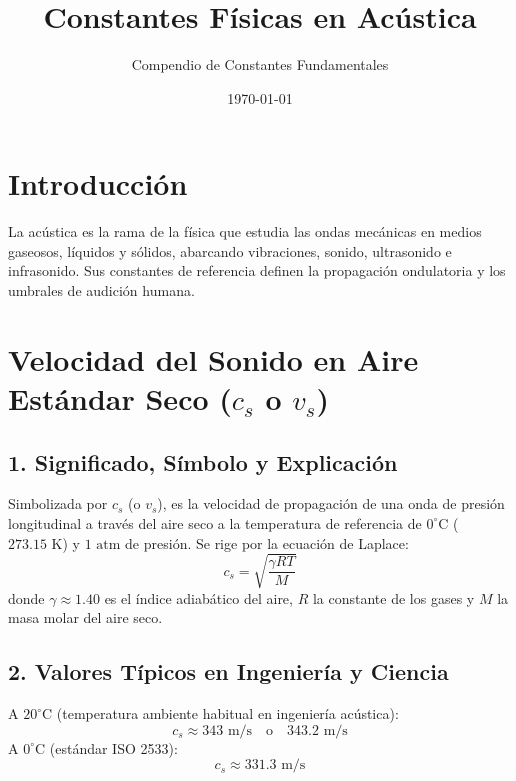 \documentclass[12pt,a4paper]{article}
\title{\textbf{Constantes Físicas en Acústica}}
\author{Compendio de Constantes Fundamentales}
\date{\today}
\begin{document}
\maketitle

\section*{Introducción}
La acústica es la rama de la física que estudia las ondas mecánicas en medios gaseosos, líquidos y sólidos, abarcando vibraciones, sonido, ultrasonido e infrasonido. Sus constantes de referencia definen la propagación ondulatoria y los umbrales de audición humana.

\section{Velocidad del Sonido en Aire Estándar Seco ($c_s$ o $v_s$)}

\subsection*{1. Significado, Símbolo y Explicación}
Simbolizada por $c_s$ (o $v_s$), es la velocidad de propagación de una onda de presión longitudinal a través del aire seco a la temperatura de referencia de $0^\circ\text{C}$ ($273.15\text{ K}$) y $1\text{ atm}$ de presión. Se rige por la ecuación de Laplace:
\begin{equation*}
c_s = \sqrt{\frac{\gamma R T}{M}}
\end{equation*}
donde $\gamma \approx 1.40$ es el índice adiabático del aire, $R$ la constante de los gases y $M$ la masa molar del aire seco.

\subsection*{2. Valores Típicos en Ingeniería y Ciencia}
A $20^\circ\text{C}$ (temperatura ambiente habitual en ingeniería acústica):
\begin{equation*}
c_s \approx 343 \text{ m/s} \quad \text{o} \quad 343.2 \text{ m/s}
\end{equation*}
A $0^\circ\text{C}$ (estándar ISO 2533):
\begin{equation*}
c_s \approx 331.3 \text{ m/s}
\end{equation*}
\end{document}
